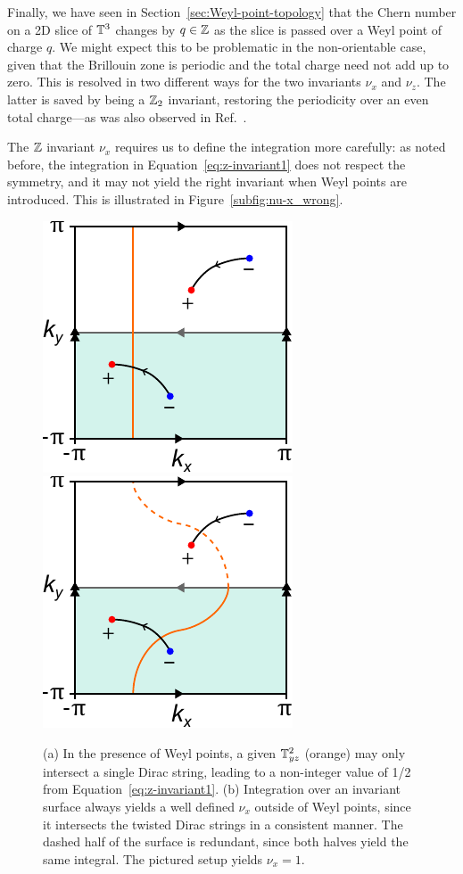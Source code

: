 Finally, we have seen in Section~\ref{sec:Weyl-point-topology} that the Chern number on a 2D slice of $\mathbb{T}^3$ changes by $q\in\mathbb{Z}$ as the slice is passed over a Weyl point of charge $q$. We might expect this to be problematic in the non-orientable case, given that the Brillouin zone is periodic and the total charge need not add up to zero. This is resolved in two different ways for the two invariants $\nu_x$ and $\nu_z$. The latter is saved by being a $\mathbb{Z}_2$ invariant, restoring the periodicity over an even total charge---as was also observed in Ref.~\cite{Fonseca-Vaidya_nonorientable}.

The $\mathbb{Z}$ invariant $\nu_x$ requires us to define the integration more carefully: as noted before, the integration in Equation~\eqref{eq:z-invariant1} does not respect the symmetry, and it may not yield the right invariant when Weyl points are introduced. This is illustrated in Figure~\ref{subfig:nu-x_wrong}.
\begin{figure}[htb!]
	\centering
	\subcaptionbox{\label{subfig:nu-x_wrong}} {\includegraphics[width=.3\textwidth]{Images/nu-x_wrong}}
	\hfil
	\subcaptionbox{\label{subfig:nu-x_right}} {\includegraphics[width=.3\textwidth]{Images/nu-x_right}}
	\caption{(a) In the presence of Weyl points, a given $\mathbb{T}_{yz}^2$ (orange) may only intersect a single Dirac string, leading to a non-integer value of 1/2 from Equation~\eqref{eq:z-invariant1}. (b) Integration over an invariant surface always yields a well defined $\nu_x$ outside of Weyl points, since it intersects the twisted Dirac strings in a consistent manner. The dashed half of the surface is redundant, since both halves yield the same integral. The pictured setup yields $\nu_x=1$.}
	\label{fig:nu-x}
\end{figure}
